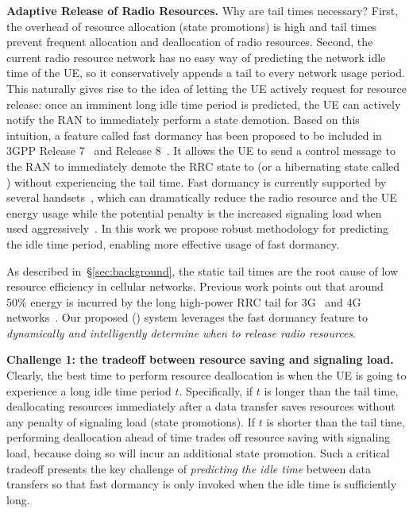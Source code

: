 
\textbf{Adaptive Release of Radio Resources.} Why are tail times necessary? First, the overhead of resource allocation (\ie state promotions) is high and tail times prevent frequent allocation and deallocation of radio resources. Second, the current radio resource network has no easy way of predicting the network idle time of the UE, so it conservatively appends a tail to every network usage period. This naturally gives rise to the idea of letting the UE actively request for resource release: once an imminent long idle time period is predicted, the UE can actively notify the RAN to immediately perform a state demotion. Based on this intuition, a feature called fast dormancy has been proposed
to be included in 3GPP Release 7~\cite{fast.dormancy.1} and Release 8~\cite{fast.dormancy.2}. It allows the UE to send a control message to the RAN to immediately demote the RRC state to \RI (or a hibernating state called \RPCH) without experiencing the tail time. Fast dormancy is currently supported by several handsets~\cite{fast.dormancy.2}, which can dramatically reduce the radio resource and the UE energy usage while the potential penalty is the increased signaling load when used aggressively~\cite{3gpp:090941, qian10_icnp}. In this work we propose robust methodology for predicting the idle time period, enabling more effective usage of fast dormancy.


\label{sec:overview}

As described in~\S\ref{sec:background}, the static tail times are the root cause of low resource efficiency in cellular networks. Previous work points out that around 50\% energy is incurred by the long high-power RRC tail for 3G~\cite{imc.3g} and 4G networks~\cite{huang12_mobisys}. Our proposed \NAMEFULL (\NAME) system leverages the fast dormancy feature to \emph{dynamically and intelligently determine when to release radio resources}.

\textbf{Challenge 1: the tradeoff between resource saving and signaling load.}
Clearly, the best time to perform resource deallocation is when the UE is going to experience a long idle time period $t$. Specifically, if $t$ is longer than the tail time, deallocating resources immediately after a data transfer saves resources without any penalty of signaling load (\ie state promotions). If $t$ is shorter than the tail time, performing deallocation ahead of time trades off resource saving with signaling load, because doing so will incur an additional state promotion. Such a critical tradeoff presents the key challenge of \emph{predicting the idle time} between data transfers so that fast dormancy is only invoked when the idle time is sufficiently long.

